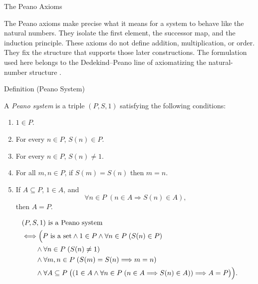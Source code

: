 \begin{topicbox}{The Peano Axioms}
\begin{exposition}
The Peano axioms make precise what it means for a system to behave like
the natural numbers. They isolate the first element, the successor map,
and the induction principle. These axioms do not define addition,
multiplication, or order. They fix the structure that supports those
later constructions. The formulation used here belongs to the
Dedekind--Peano line of axiomatizing the natural-number structure
\citep{dedekind1901essays,PeanoArithmeticesPrincipia1889}.
\end{exposition}

\begin{definitionbox}{Definition (Peano System)}
\begin{definition}
\label{def:peano-system}
A \emph{Peano system} is a triple $(P,S,1)$ satisfying the following
conditions:
\begin{enumerate}
  \item[\textbf{P1.}] $1 \in P$.
  \item[\textbf{P2.}] For every $n \in P$, $S(n) \in P$.
  \item[\textbf{P3.}] For every $n \in P$, $S(n) \neq 1$.
  \item[\textbf{P4.}] For all $m,n \in P$, if $S(m)=S(n)$ then $m=n$.
  \item[\textbf{P5.}] If $A \subseteq P$, $1 \in A$, and
  \[
    \forall n \in P\;(n \in A \Longrightarrow S(n) \in A),
  \]
  then $A=P$.
\end{enumerate}
\end{definition}
\end{definitionbox}

\begin{remark*}
\[
\begin{aligned}
&(P,S,1) \text{ is a Peano system}\\
&\Longleftrightarrow
\Bigl(P \text{ is a set} \land 1 \in P
\land \forall n \in P\;(S(n) \in P) \\
&\qquad \land \forall n \in P\;(S(n) \neq 1) \\
&\qquad \land \forall m,n \in P\;(S(m)=S(n) \Longrightarrow m=n) \\
&\qquad \land \forall A \subseteq P\;
\bigl((1 \in A \land
\forall n \in P\;(n \in A \Longrightarrow S(n) \in A))
\Longrightarrow A=P\bigr)\Bigr).
\end{aligned}
\]
\end{remark*}


\end{topicbox}
